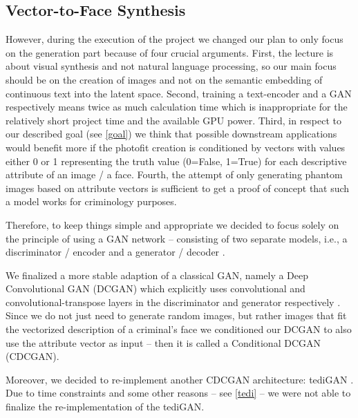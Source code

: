 \documentclass[12pt, a4paper]{article}
\begin{document}
\subsection{Vector-to-Face Synthesis}\label{vec-to-face}
However, during the execution of the project we changed our plan to only focus on the generation part because of four
crucial arguments. First, the lecture is about visual synthesis and not natural language processing, so our main focus
should be on the creation of images and not on the semantic embedding of continuous text into the latent space.
Second, training a text-encoder and a GAN respectively means twice as much calculation time which is inappropriate for
the relatively short project time and the available GPU power.
Third, in respect to our described goal (see \ref{goal}) we think that possible
downstream applications would benefit more if the photofit creation is conditioned by vectors with values either 0 or 1
representing the truth value (0=False, 1=True) for each descriptive attribute of an image / a face. Fourth, the attempt
of only generating phantom images based on attribute vectors is sufficient to get a proof of concept that such a model
works for criminology purposes.

Therefore, to keep things simple and appropriate we decided to focus solely on the principle of using a GAN network --
consisting of two separate models, i.e., a discriminator / encoder and a generator / decoder \cite{gan}.

We finalized a more stable adaption of a classical GAN, namely a Deep Convolutional GAN (DCGAN) which explicitly uses
convolutional and con\-vo\-lu\-tio\-nal-transpose layers in the discriminator and generator respectively \cite{dcgan}.
Since we do not just need to generate random images, but rather images that fit the vectorized description of
a criminal's face we conditioned our DCGAN to also use the attribute vector as input -- then it is called a Conditional
DCGAN (CDCGAN).

Moreover, we decided to re-implement another CDCGAN architecture: tediGAN \cite{Xia_2021_CVPR}.
Due to time constraints and some other reasons -- see \ref{tedi} -- we were not able to finalize the
re-implementation of the tediGAN.
\end{document}
